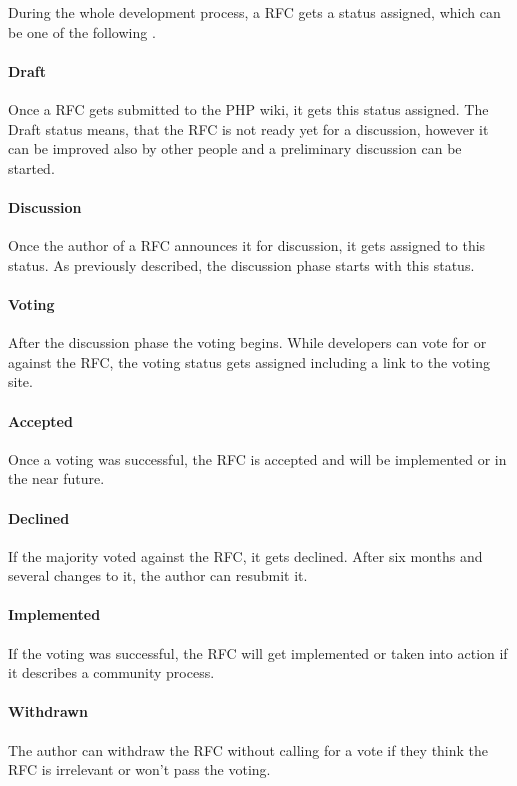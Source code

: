 During the whole development process, a \ac{RFC} gets a status assigned, which
can be one of the following \cite{PHPRFC}.

\paragraph{Draft}

Once a \ac{RFC} gets submitted to the PHP wiki, it gets this status assigned.
The Draft status means, that the \ac{RFC} is not ready yet for a discussion,
however it can be improved also by other people and a preliminary discussion
can be started.

\paragraph{Discussion}

Once the author of a \ac{RFC} announces it for discussion, it gets assigned to
this status. As previously described, the discussion phase starts with this
status.

\paragraph{Voting}

After the discussion phase the voting begins. While developers can vote for or
against the \ac{RFC}, the voting status gets assigned including a link to the
voting site.

\paragraph{Accepted}

Once a voting was successful, the \ac{RFC} is accepted and will be implemented
or in the near future.

\paragraph{Declined}

If the majority voted against the \ac{RFC}, it gets declined. After six months
and several changes to it, the author can resubmit it.

\paragraph{Implemented}

If the voting was successful, the \ac{RFC} will get implemented or taken into
action if it describes a community process.

\paragraph{Withdrawn}

The author can withdraw the \ac{RFC} without calling for a vote if they think
the \ac{RFC} is irrelevant or won't pass the voting.


